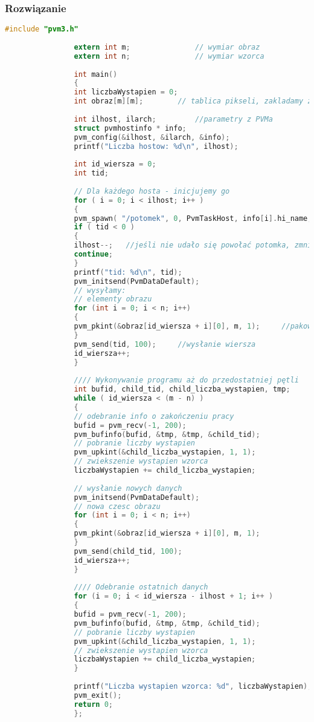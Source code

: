 			\subsubsection{Rozwiązanie}
				\begin{lstlisting}[language=C]
				#include "pvm3.h"
				
				extern int m;				// wymiar obraz
				extern int n;				// wymiar wzorca
				
				int main()
				{
				int liczbaWystapien = 0;
				int obraz[m][m];		// tablica pikseli, zakladamy ze tak reprezentowany jest obraz
				
				int ilhost, ilarch;			//parametry z PVMa
				struct pvmhostinfo * info;
				pvm_config(&ilhost, &ilarch, &info);
				printf("Liczba hostow: %d\n", ilhost);
				
				int id_wiersza = 0;
				int tid;
				
				// Dla każdego hosta - inicjujemy go
				for ( i = 0; i < ilhost; i++ )
				{
				pvm_spawn( "/potomek", 0, PvmTaskHost, info[i].hi_name, 1, &tid);	//powołanie potomka
				if ( tid < 0 )
				{
				ilhost--;	//jeśli nie udało się powołać potomka, zmniejszamy liczbę hostów i kontynuujemy
				continue;
				}
				printf("tid: %d\n", tid);
				pvm_initsend(PvmDataDefault);
				// wysyłamy:
				// elementy obrazu
				for (int i = 0; i < n; i++)
				{
				pvm_pkint(&obraz[id_wiersza + i][0], m, 1);		//pakowanie całego wiersza
				}
				pvm_send(tid, 100);		//wysłanie wiersza
				id_wiersza++;
				}
				
				//// Wykonywanie programu aż do przedostatniej pętli
				int bufid, child_tid, child_liczba_wystapien, tmp;
				while ( id_wiersza < (m - n) )
				{
				// odebranie info o zakończeniu pracy
				bufid = pvm_recv(-1, 200);
				pvm_bufinfo(bufid, &tmp, &tmp, &child_tid);
				// pobranie liczby wystapien
				pvm_upkint(&child_liczba_wystapien, 1, 1);
				// zwiekszenie wystapien wzorca
				liczbaWystapien += child_liczba_wystapien;
				
				// wysłanie nowych danych
				pvm_initsend(PvmDataDefault);
				// nowa czesc obrazu
				for (int i = 0; i < n; i++)
				{
				pvm_pkint(&obraz[id_wiersza + i][0], m, 1);
				}
				pvm_send(child_tid, 100);
				id_wiersza++;
				}
				
				//// Odebranie ostatnich danych
				for	(i = 0; i < id_wiersza - ilhost + 1; i++ )
				{
				bufid = pvm_recv(-1, 200);
				pvm_bufinfo(bufid, &tmp, &tmp, &child_tid);
				// pobranie liczby wystapien
				pvm_upkint(&child_liczba_wystapien, 1, 1);
				// zwiekszenie wystapien wzorca
				liczbaWystapien += child_liczba_wystapien;
				}
				
				printf("Liczba wystapien wzorca: %d", liczbaWystapien);
				pvm_exit();
				return 0;
				};
				
				\end{lstlisting}
		\newpage
